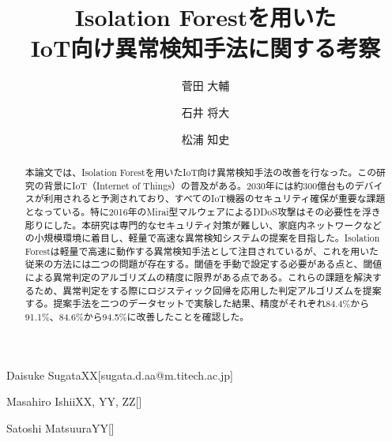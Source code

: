 \documentclass{css}
\begin{document}

\title{Isolation Forestを用いた\\IoT向け異常検知手法に関する考察}



\author{菅田 大輔}{Daisuke Sugata}{XX}[sugata.d.aa@m.titech.ac.jp]
\author{石井 将大}{Masahiro Ishii}{XX, YY, ZZ}[]
\author{松浦 知史}{Satoshi Matsuura}{YY}[]



\begin{abstract}
    本論文では、Isolation Forestを用いたIoT向け異常検知手法の改善を行なった。この研究の背景にIoT（Internet of Things）の普及がある。2030年には約300億台ものデバイスが利用されると予測されており、すべてのIoT機器のセキュリティ確保が重要な課題となっている。特に2016年のMirai型マルウェアによるDDoS攻撃はその必要性を浮き彫りにした。本研究は専門的なセキュリティ対策が難しい、家庭内ネットワークなどの小規模環境に着目し、軽量で高速な異常検知システムの提案を目指した。Isolation Forestは軽量で高速に動作する異常検知手法として注目されているが、これを用いた従来の方法には二つの問題が存在する。閾値を手動で設定する必要がある点と、閾値による異常判定のアルゴリズムの精度に限界がある点である。これらの課題を解決するため、異常判定をする際にロジスティック回帰を応用した判定アルゴリズムを提案する。提案手法を二つのデータセットで実験した結果、精度がそれぞれ84.4\%から91.1\%、84.6\%から94.5\%に改善したことを確認した。

\end{abstract}
\end{document}
